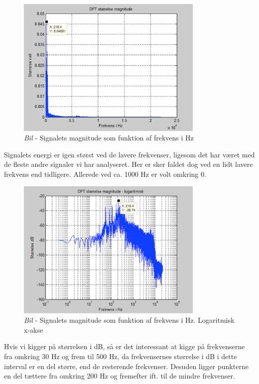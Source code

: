 \begin{figure}[H]
	\centering
	\includegraphics[width=0.8\textwidth]{Figurer/Bil2}
	\caption{\textit{Bil} - Signalets magnitude som funktion af frekvens i Hz}
\end{figure}

Signalets energi er igen størst ved de lavere frekvenser, ligesom det har været med de fleste andre signaler vi har analyseret. Her er sker faldet dog ved en lidt lavere frekvens end tidligere. Allerede ved ca. 1000 Hz er volt omkring 0.

\begin{figure}[H]
	\centering
	\includegraphics[width=0.8\textwidth]{Figurer/Bil3}
	\caption{\textit{Bil} - Signalets magnitude som funktion af frekvens i Hz. Logaritmisk x-akse}
\end{figure}

Hvis vi kigger på størrelsen i dB, så er det interessant at kigge på frekvenserne fra omkring 30 Hz og frem til 500 Hz, da frekvensernes størrelse i dB i dette interval er en del større, end de resterende frekvenser. Desuden ligger punkterne en del tættere fra omkring 200 Hz og fremefter ift. til de mindre frekvenser.

